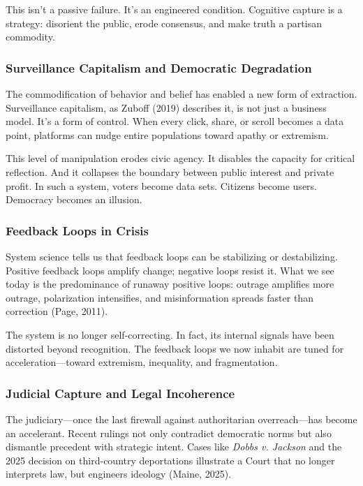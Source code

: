 This isn't a passive failure. It's an engineered condition. Cognitive
capture is a strategy: disorient the public, erode consensus, and make
truth a partisan commodity.

\subsubsection{Surveillance Capitalism and Democratic
Degradation}\label{surveillance-capitalism-and-democratic-degradation}

The commodification of behavior and belief has enabled a new form of
extraction. Surveillance capitalism, as Zuboff (2019) describes it, is
not just a business model. It's a form of control. When every click,
share, or scroll becomes a data point, platforms can nudge entire
populations toward apathy or extremism.

This level of manipulation erodes civic agency. It disables the capacity
for critical reflection. And it collapses the boundary between public
interest and private profit. In such a system, voters become data sets.
Citizens become users. Democracy becomes an illusion.

\subsubsection{Feedback Loops in Crisis}\label{feedback-loops-in-crisis}

System science tells us that feedback loops can be stabilizing or
destabilizing. Positive feedback loops amplify change; negative loops
resist it. What we see today is the predominance of runaway positive
loops: outrage amplifies more outrage, polarization intensifies, and
misinformation spreads faster than correction (Page, 2011).

The system is no longer self-correcting. In fact, its internal signals
have been distorted beyond recognition. The feedback loops we now
inhabit are tuned for acceleration---toward extremism, inequality, and
fragmentation.

\subsubsection{Judicial Capture and Legal
Incoherence}\label{judicial-capture-and-legal-incoherence}

The judiciary---once the last firewall against authoritarian
overreach---has become an accelerant. Recent rulings not only contradict
democratic norms but also dismantle precedent with strategic intent.
Cases like \emph{Dobbs v. Jackson} and the 2025 decision on
third-country deportations illustrate a Court that no longer interprets
law, but engineers ideology (Maine, 2025).

